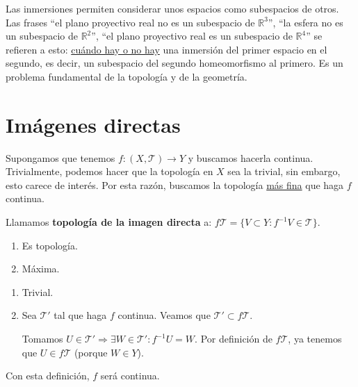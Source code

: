 \begin{obs}
Las inmersiones permiten considerar unos espacios como subespacios de otros. Las frases ``el plano proyectivo real no es un subespacio de $\mathbb{R}^3$'', ``la esfera no es un subespacio de $\mathbb{R}^2$'', ``el plano proyectivo real es un subespacio de $\mathbb{R}^4$'' se refieren a esto: \underline{cuándo hay o no hay} una inmersión del primer espacio en el segundo, es decir, un subespacio del segundo homeomorfismo al primero. Es un problema fundamental de la topología
y de la geometría.
\end{obs}


\section{Imágenes directas}%
\label{sec:imagenes_directas}
Supongamos que tenemos $f: \left( X, \mathcal{T} \right) \rightarrow Y$ y buscamos hacerla continua. Trivialmente, podemos hacer que la topología en $X$ sea la trivial, sin embargo, esto carece de interés. Por esta razón, buscamos la topología \underline{más fina} que haga $f$ continua.

\begin{defi}
Llamamos \textbf{topología de la imagen directa} a: $f\mathcal{T} = \{V \subset Y: f^{-1}V \in \mathcal{T}\}$.
\end{defi}
\begin{prop}    
\begin{enumerate}
    \item Es topología.
    \item Máxima. 
\end{enumerate}
\end{prop}
\begin{demo}
\begin{enumerate}
    \item Trivial.
    \item Sea $\mathcal{T}'$ tal que haga $f$ continua. Veamos que $\mathcal{T}' \subset f\mathcal{T}$.

    Tomamos $U \in \mathcal{T}' \Rightarrow \exists W \in \mathcal{T}': f^{-1} U = W$. Por definición de $f \mathcal{T}$, ya tenemos que $U \in f \mathcal{T}$ (porque $W \in Y$).
\end{enumerate}
\end{demo}
\begin{obs}
Con esta definición, $f$ será continua.
\end{obs}

